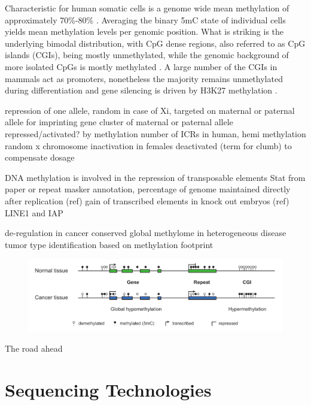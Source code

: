Characteristic for human somatic cells is a genome wide mean methylation of approximately 70\%-80\% \cite{Bird2002}. Averaging the binary 5mC state of individual cells yields mean methylation levels per genomic position. What is striking is the underlying bimodal distribution, with CpG dense regions, also referred to as CpG islands (CGIs), being mostly unmethylated, while the genomic background of more isolated CpGs is mostly methylated \cite{Bird2002}.
A large number of the CGIs in mammals act as promoters, nonetheless the majority remains unmethylated during differentiation and gene silencing is driven by H3K27 methylation \cite{Larsen1992, Greenberg2019}.

repression of one allele, random in case of Xi, targeted on maternal or paternal allele for imprinting
gene cluster of maternal or paternal allele repressed/activated? by methylation
number of ICRs in human, hemi methylation
random x chromosome inactivation in females deactivated (term for clumb) to compensate dosage

DNA methylation is involved in the repression of transposable elements
Stat from paper or repeat masker annotation, percentage of genome 
maintained directly after replication (ref) gain of transcribed elements in knock out embryos (ref)
LINE1 and IAP

de-regulation in cancer
conserved global methylome in heterogeneous disease
tumor type identification based on methylation footprint \cite{Capper2018}

\begin{figure}[h]
	\centering
	\includegraphics[width=1.0\textwidth]{figures/intro/cancer.pdf}
	\captionsetup{format=plain}
	\caption[DNA methylation in cancer]{}
	\label{fig:intro:cancer}
\end{figure}


The road ahead \cite{McGuire2020}




\section{Sequencing Technologies}
\label{sec:intro:sequencing}

